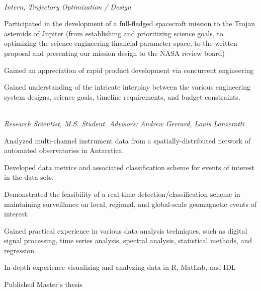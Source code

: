 \\  
\vspace{-0.8em}
\textit{Intern, Trajectory Optimization / Design} 
\begin{itemize*}
  \item
    Participated in the development of a full-fledged spacecraft mission to
    the Trojan asteroids of Jupiter
    (from %
    establishing and prioritizing science goals, to optimizing the science-engineering-financial
    parameter space, to the written proposal and presenting our mission design to the NASA review
    board)
  \item 
    Gained an appreciation of rapid product development via concurrent engineering
  \item Gained understanding of the intricate interplay between the
    various engineering system designs, science goals, timeline
    requirements, and budget constraints.

\end{itemize*}
   
\\  
\vspace{-0.8em}
\textit{Research Scientist, M.S. Student. Advisors: Andrew Gerrard,
Louis Lanzerotti} 
\begin{itemize*}
  \item
    Analyzed multi-channel instrument data from a spatially-distributed
    network of automated observatories in Antarctica.
  \item Developed data metrics and associated classification scheme for
    events of interest in the data sets.
  \item Demonstrated the feasibility of a real-time
    detection/classification scheme in maintaining surveillance on
    local, regional, and global-scale geomagnetic events of interest.
  \item Gained practical experience in various data analysis techniques,
    such as digital signal processing, time series analysis, spectral analysis,
    statistical methods, and regression.
  \item In-depth experience visualizing and analyzing data in R, MatLab,
    and IDL
  \item Published Master's thesis
\end{itemize*}

